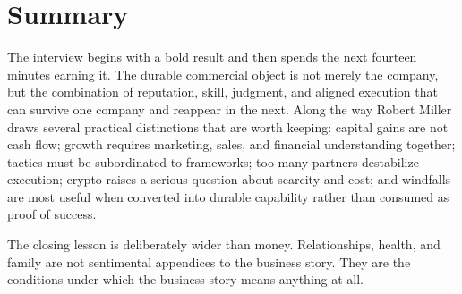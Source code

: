 \section{Summary}

The interview begins with a bold result and then spends the next fourteen minutes earning it. The durable commercial object is not merely the company, but the combination of reputation, skill, judgment, and aligned execution that can survive one company and reappear in the next. Along the way Robert Miller draws several practical distinctions that are worth keeping: capital gains are not cash flow; growth requires marketing, sales, and financial understanding together; tactics must be subordinated to frameworks; too many partners destabilize execution; crypto raises a serious question about scarcity and cost; and windfalls are most useful when converted into durable capability rather than consumed as proof of success.

The closing lesson is deliberately wider than money. Relationships, health, and family are not sentimental appendices to the business story. They are the conditions under which the business story means anything at all.